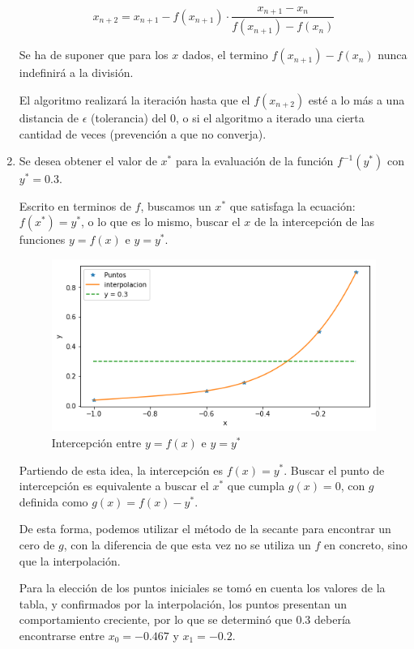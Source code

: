 \documentclass[spanish, fleqn]{article}
\begin{document}
\begin{enumerate}
  $$x_{n+2} = x_{n+1} - f(x_{n+1}) \cdot \frac{x_{n+1}-x_{n}}{f(x_{n+1}) - f(x_n)}$$ 
  
  Se ha de suponer que para los $x$ dados, el termino $f(x_{n+1}) - f(x_n)$ nunca indefinirá a la división.
  
  El algoritmo realizará la iteración hasta que  
  el $f(x_{n+2})$ esté a lo más a una distancia de $\epsilon$ (tolerancia) del 0, o si el algoritmo a iterado una cierta cantidad de veces (prevención a que no converja).
  
  \item %
	Se desea obtener el valor de $x^*$ para la evaluación de la función $f^{-1} (y^*)$ con $y^*=0.3$. 
	
	Escrito en terminos de $f$, buscamos un $x^*$ que satisfaga la ecuación: $f(x^*) = y^*$, o lo que es lo mismo, buscar el $x$ de la intercepción de las funciones $y = f(x)$ e $ y = y^*$.
	  
     \begin{figure}[h]
     \caption{Intercepción entre $y=f(x)$ e $y=y^*$}
    \centering 
 	\includegraphics[scale=0.6]{intercepcion.png}
   \end{figure}
	
	Partiendo de esta idea, la intercepción es $f(x) = y^*$. Buscar el punto de intercepción es equivalente a buscar el $x^*$ que cumpla $g(x) = 0$, con $g$ definida como $g(x) = f(x) - y^*$.
	
	De esta forma, podemos utilizar el método de la secante para encontrar un cero de $g$, con la diferencia de que esta vez no se utiliza un $f$ en concreto, sino que la interpolación.
  
	Para la elección de los puntos iniciales se tomó en cuenta los valores de la tabla, y confirmados por la interpolación, los puntos presentan un comportamiento creciente, por lo que se determinó que $0.3$ debería encontrarse entre $x_0 = -0.467$ y $x_1=-0.2$.
	

\end{enumerate}
\end{document}
